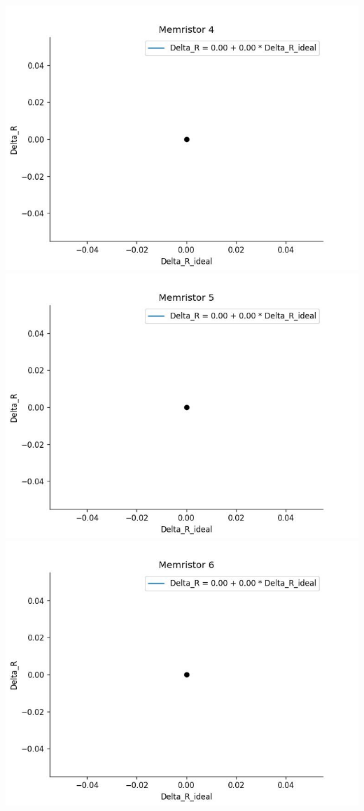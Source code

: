     \includegraphics[width=\textwidth / 2]{code/plots/model_2_memristor_4}
    \includegraphics[width=\textwidth / 2]{code/plots/model_2_memristor_5}
    \includegraphics[width=\textwidth / 2]{code/plots/model_2_memristor_6}
